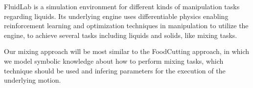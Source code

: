 FluidLab is a simulation environment for different kinds of manipulation tasks regarding liquids. Its underlying engine uses differentiable physics 
enabling reinforcement learning and optimization techniques in manipulation to utilize the engine, to achieve several tasks 
including liquids and solids, like mixing tasks. 

Our mixing approach will be most similar to the FoodCutting approach, in which we model symbolic knowledge about how to perform
mixing tasks, which technique should be used and infering parameters for the execution of the underlying motion.

